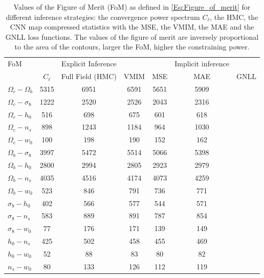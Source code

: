 \documentclass{aa}
\begin{document}
\begin{center}
\begin{table}
\caption{ Values of the Figure of Merit (FoM) as defined in \autoref{Eq:Figure_of_merit} for different inference strategies: the convergence power spectrum $C_{\ell}$, the HMC, the CNN map compressed statistics with the MSE, the VMIM, the MAE and the GNLL loss functions. The values of the figure of merit are inversely proportional to the area of the contours, larger the FoM, higher the constraining power.}
\begin{tabular}{lcccccc} 
 \hline
    FoM &  & Explicit Inference  &  & & Implicit inference  \\
     & $C_{\ell}$ & Full Field (HMC)&  VMIM & MSE & MAE & GNLL   \\
  \hline
 $\Omega_c-  \Omega_b$ & 5315 & 6951 & 6591 & 5651 & 5909\\
 $\Omega_c-  \sigma_8$ & 1222 & 2520 & 2526 & 2043 & 2316\\
 $\Omega_c-  h_0$      & 516  & 698  & 675  & 601  & 618\\
 $\Omega_c-  n_s$      & 898  & 1243 & 1184 & 964  & 1030\\
 $\Omega_c-  w_0$      & 100  & 198  & 190  & 152  & 162\\
 $\Omega_b-  \sigma_8$ & 3997 & 5472 & 5514 & 5066 & 5398\\
 $\Omega_b-  h_0$      & 2800 & 2994 & 2805 & 2923 & 2979\\
 $\Omega_b-  n_s$      & 4035 & 4516 & 4174 & 4073 & 4259\\
 $\Omega_b-  w_0$      & 523  & 846  & 791  & 736  & 771\\
 $\sigma_8-  h_0$      & 402  & 566  & 577  & 544  & 571\\
 $\sigma_8-  n_s$      & 583  & 889  & 891  & 787  & 854\\ 
 $\sigma_8-  w_0$      & 77   & 176  & 171  & 139  & 149\\
 $h_0-       n_s$      & 425  & 502  & 458  & 455  & 469\\
 $h_0-       w_0$      & 52   & 88   & 83   & 80   & 82\\
 $n_s-       w_0$      & 80   & 133  & 126  & 112  & 119\\
     \hline
\end{tabular}
\label{tab:f_o_m}
\end{table}
\end{center}
\end{document}

